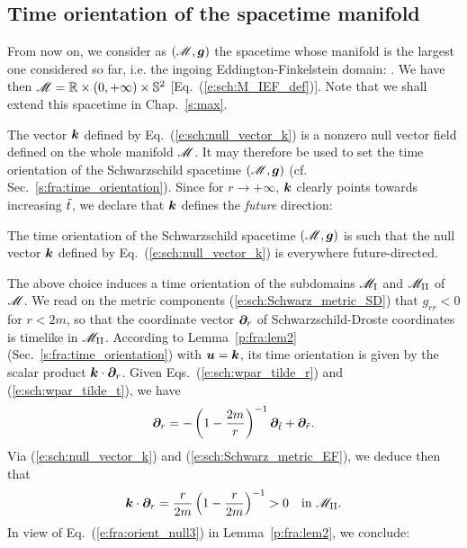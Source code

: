 \subsection{Time orientation of the spacetime manifold} \label{s:sch:time_orientation}

From now on, we consider as
 $(\mathscr{M},\bm{g})$ the spacetime
whose manifold is the largest one considered so far, i.e. the ingoing Eddington-Finkelstein
domain:
\be \label{s:sch:def_Schwarz_spacetime}
   .
\ee
We have then $\mathscr{M} = \mathbb{R}\times(0,+\infty)\times\mathbb{S}^2$ [Eq.~(\ref{e:sch:M_IEF_def})].
Note that we shall extend this spacetime in Chap.~\ref{s:max}.

The vector $\bm{k}$ defined by Eq.~(\ref{e:sch:null_vector_k}) is a nonzero null vector field
defined on the whole manifold
$\mathscr{M}$. It may therefore be used to set the time orientation of the Schwarzschild spacetime $(\mathscr{M},\bm{g})$
(cf. Sec.~\ref{s:fra:time_orientation}). Since for $r\rightarrow+\infty$, $\bm{k}$
clearly points towards increasing ${\tilde t}$, we declare that $\bm{k}$ defines
the \emph{future} direction:
\begin{prop}
The time orientation of the Schwarzschild spacetime $(\mathscr{M}, \bm{g})$ is such
that the null vector $\bm{k}$ defined by Eq.~(\ref{e:sch:null_vector_k})
is everywhere future-directed.
\end{prop}

The above choice induces a time orientation of the subdomains
$\mathscr{M}_{\rm I}$ and $\mathscr{M}_{\rm II}$ of $\mathscr{M}$.
We read on the metric components (\ref{e:sch:Schwarz_metric_SD}) that $g_{rr} < 0$
for $r< 2m$, so that the coordinate vector
$\bm{\partial}_r$ of Schwarzschild-Droste coordinates is timelike in $\mathscr{M}_{\rm II}$.
According to Lemma~\ref{p:fra:lem2} (Sec.~\ref{s:fra:time_orientation}) with $\bm{u}=\bm{k}$,
its time orientation is given by the scalar product $\bm{k}\cdot\bm{\partial}_r$. Given
Eqs.~(\ref{e:sch:wpar_tilde_r}) and (\ref{e:sch:wpar_tilde_t}), we have
\[
    \bm{\partial}_r = - \left( 1 - \frac{2m}{r} \right) ^{-1} \bm{\partial}_{{\tilde t}}
        + \bm{\partial}_{\tilde r} .
\]
Via (\ref{e:sch:null_vector_k}) and (\ref{e:sch:Schwarz_metric_EF}), we deduce
then that
\[
    \bm{k}\cdot\bm{\partial}_r = \frac{r}{2m} \left( 1 - \frac{r}{2m} \right) ^{-1}
    > 0 \quad\mbox{in} \ \mathscr{M}_{\rm II} .
\]
In view of Eq.~(\ref{e:fra:orient_null3}) in Lemma~\ref{p:fra:lem2}, we conclude:

